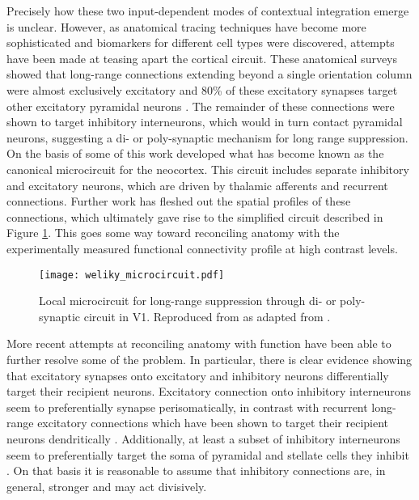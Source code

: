 Precisely how these two input-dependent modes of contextual
integration emerge is unclear. However, as anatomical tracing
techniques have become more sophisticated and biomarkers for different
cell types were discovered, attempts have been made at teasing apart
the cortical circuit. These anatomical surveys showed that long-range
connections extending beyond a single orientation column were almost
exclusively excitatory and 80\% of these excitatory synapses target
other excitatory pyramidal neurons
\citep{Hirsch1991,Kisvarday1997a}. The remainder of these connections
were shown to target inhibitory interneurons, which would in turn
contact pyramidal neurons, suggesting a di- or poly-synaptic mechanism
for long range suppression. On the basis of some of this work
\cite{Douglas1991} developed what has become known as the canonical
microcircuit for the neocortex. This circuit includes separate
inhibitory and excitatory neurons, which are driven by thalamic
afferents and recurrent connections. Further work has fleshed out the
spatial profiles of these connections, which ultimately gave rise to
the simplified circuit described in Figure \ref{V1MicroCircuit}. This
goes some way toward reconciling anatomy with the experimentally
measured functional connectivity profile at high contrast levels.

\begin{figure}
	\centering
        \texttt{[image: weliky\_microcircuit.pdf]}
	\caption[Local microcircuit for lateral interactions in V1.]%
                {Local microcircuit for long-range suppression through
                  di- or poly-synaptic circuit in V1. Reproduced from
                  \cite{Miikkulainen2005b} as adapted from
                  \cite{Weliky1995}.}
	\label{V1MicroCircuit}
\end{figure}

More recent attempts at reconciling anatomy with function have been
able to further resolve some of the problem. In particular, there is
clear evidence showing that excitatory synapses onto excitatory and
inhibitory neurons differentially target their recipient
neurons. Excitatory connection onto inhibitory interneurons seem to
preferentially synapse perisomatically, in contrast with recurrent
long-range excitatory connections which have been shown to target
their recipient neurons dendritically
\citep{Gilbert1990,McGuire1991}. Additionally, at least a subset of
inhibitory interneurons seem to preferentially target the soma of
pyramidal and stellate cells they inhibit \citep{Markram2004}. On that
basis it is reasonable to assume that inhibitory connections are, in
general, stronger and may act divisively.

